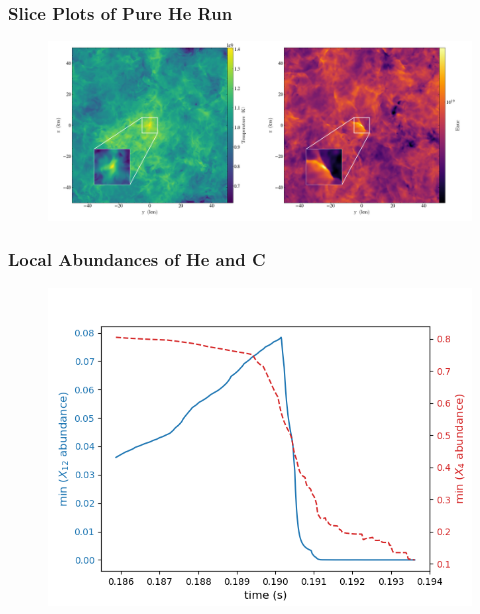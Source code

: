 \documentclass{beamer}
\begin{document}
\begin{frame}
	\frametitle{Slice Plots of Pure He Run}

        \begin{figure}
    \begin{center}
      \includegraphics[width=.90\linewidth]{combined_512_10e6_1.0_new.png}
    \end{center}
  \end{figure}


\end{frame}


\begin{frame}
        \frametitle{Local Abundances of He and C}

        \begin{figure}
    \begin{center}
      \includegraphics[width=.70\linewidth]{He4_v_C12.png}
    \end{center}
  \end{figure}


\end{frame}
\end{document}
